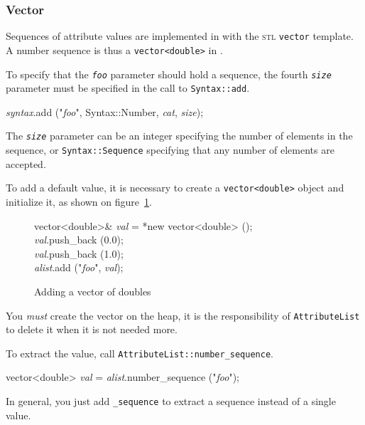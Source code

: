 \documentclass{article}
\newcommand{\cplusplus}%
{{\leavevmode{\rm{\hbox{C\hskip -0.1ex\raise 0.5ex\hbox{\tiny ++}}}}}}
\newcommand{\code}[1]{\texttt{#1}}
\begin{document}
\subsubsection{Vector}

Sequences of attribute values are implemented in \cplusplus{} with the
\textsc{stl} \code{vector} template.  A number sequence is thus a
\code{vector<double>} in \cplusplus{}.

To specify that the \texttt{\textit{foo}} parameter should hold a
sequence, the fourth \texttt{\textit{size}} parameter must be
specified in the call to \code{Syntax::add}.
\begin{center}
  \begin{tt}
    \textit{syntax}.add ("\textit{foo}", Syntax::Number, 
    \textit{cat}, \textit{size});
  \end{tt}
\end{center}
The \texttt{\textit{size}} parameter can be an integer specifying the
number of elements in the sequence, or \code{Syntax::Sequence}
specifying that any number of elements are accepted.

To add a default value, it is necessary to create a
\code{vector<double>} object and initialize it, as shown on
figure~\ref{fig:number-vector}.
\pagebreak{}

\begin{figure}[htbp]
  \begin{tt}
    vector<double>\& \textit{val} = *new vector<double> ();\\
    \textit{val}.push\_back (0.0);\\
    \textit{val}.push\_back (1.0);\\
    \textit{alist}.add ("\textit{foo}", \textit{val});
  \end{tt}
  \caption{Adding a vector of doubles}
  \label{fig:number-vector}
\end{figure}
You \emph{must} create the vector on the heap, it is the
responsibility of \code{AttributeList} to delete it when it is not
needed more.

To extract the value, call \code{AttributeList::number\_sequence}.
\begin{center}
  \begin{tt}
    vector<double> \textit{val} = \textit{alist}.number\_sequence
    ("\textit{foo}");
  \end{tt}
\end{center}
In general, you just add \code{\_sequence} to extract a sequence
instead of a single value.
\end{document}
